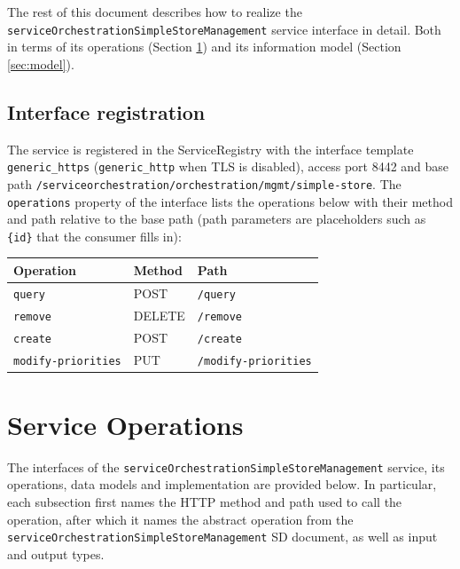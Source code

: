 \documentclass[a4paper]{arrowhead}
\begin{document}
The rest of this document describes how to realize the \texttt{service\allowbreak{}Orchestration\allowbreak{}Simple\allowbreak{}Store\allowbreak{}Management} service
interface in detail. Both in terms of its operations (Section \ref{sec:operations}) and its information model (Section \ref{sec:model}).

\subsection{Interface registration}

The service is registered in the ServiceRegistry with the interface template \texttt{generic\_\allowbreak{}https} (\texttt{generic\_\allowbreak{}http} when TLS is disabled), access port 8442 and base path \texttt{/\allowbreak{}serviceorchestration/\allowbreak{}orchestration/\allowbreak{}mgmt/\allowbreak{}simple-\allowbreak{}store}. The \texttt{operations} property of the interface lists the operations below with their method and path relative to the base path (path parameters are placeholders such as \texttt{\{id\}} that the consumer fills in):

\noindent\begin{longtable}{| p{5.2cm} | p{1.6cm} | p{8.4cm} |} \hline
\rowcolor{gray!33} Operation & Method & Path \\ \hline \endhead
\texttt{query} & POST & \texttt{/\allowbreak{}query} \\ \hline
\texttt{remove} & DELETE & \texttt{/\allowbreak{}remove} \\ \hline
\texttt{create} & POST & \texttt{/\allowbreak{}create} \\ \hline
\texttt{modify-\allowbreak{}priorities} & PUT & \texttt{/\allowbreak{}modify-\allowbreak{}priorities} \\ \hline
\end{longtable}

\newpage

\section{Service Operations}
\label{sec:operations}

The interfaces of the \texttt{service\allowbreak{}Orchestration\allowbreak{}Simple\allowbreak{}Store\allowbreak{}Management} service, its operations, data models and implementation are provided below.
In particular, each subsection first names the HTTP method and path used to call the operation, after which it names the abstract operation from the \texttt{service\allowbreak{}Orchestration\allowbreak{}Simple\allowbreak{}Store\allowbreak{}Management} SD document, as well as input and output types.
\end{document}
